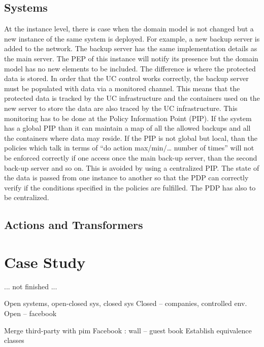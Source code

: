 \documentclass{sig-alternate}
\begin{document}
\subsection{Systems}

At the instance level, there is case when the domain model is not changed but a new instance of the same system is deployed.
For example, a new backup server is added to the network. The backup server has the same implementation details as the main server.
The PEP of this instance will notify its presence but the domain model has no new elements to be included.
The difference is where the protected data is stored.
In order that the UC control works correctly, the backup server must be populated with data via a monitored channel.
This means that the protected data is tracked by the UC infrastructure and the containers used on the new server to store the data are also traced by the UC infrastructure.
This monitoring has to be done at the Policy Information Point (PIP). 
If the system has a global PIP than it can maintain a map of all the allowed backups and all the containers where data may reside.
If the PIP is not global but local, than the policies which talk in terms of ``do action max/min/… number of times'' will not be enforced correctly if one access once the main back-up server, than the second back-up server and so on. This is avoided by using a centralized PIP. 
The state of the data is passed from one instance to another so that the PDP can correctly verify if the conditions specified in the policies are fulfilled.
The PDP has also to be centralized.

\subsection{Actions and Transformers}


\section{Case Study}
... not finished ...

Open systems, open-closed sys, closed sys
Closed – companies, controlled env. 
Open – facebook

Merge third-party with pim
Facebook : wall – guest book
Establish equivalence classes
\end{document}
